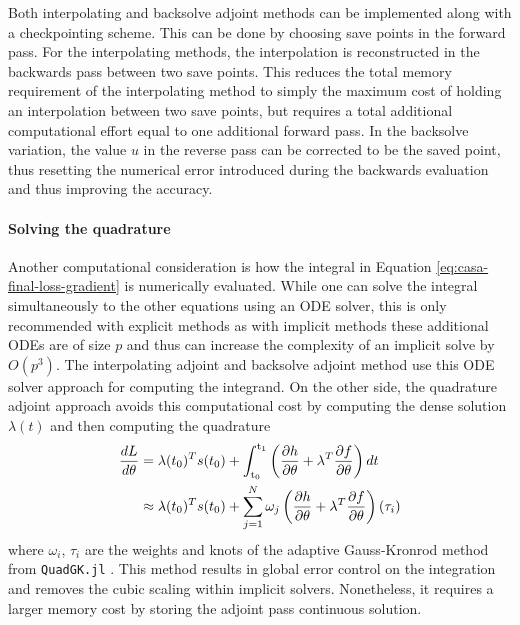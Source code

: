 Both interpolating and backsolve adjoint methods can be implemented along with a checkpointing scheme. 
This can be done by choosing save points in the forward pass. 
For the interpolating methods, the interpolation is reconstructed in the backwards pass between two save points. 
This reduces the total memory requirement of the interpolating method to simply the maximum cost of holding an interpolation between two save points, but requires a total additional computational effort equal to one additional forward pass. 
In the backsolve variation, the value $u$ in the reverse pass can be corrected to be the saved point, thus resetting the numerical error introduced during the backwards evaluation and thus improving the accuracy.

\paragraph{Solving the quadrature}

Another computational consideration is how the integral in Equation \eqref{eq:casa-final-loss-gradient} is numerically evaluated. 
While one can solve the integral simultaneously to the other equations using an ODE solver, this is only recommended with explicit methods as with implicit methods these additional ODEs are of size $p$ and thus can increase the complexity of an implicit solve by $O(p^3)$. 
The interpolating adjoint and backsolve adjoint method use this ODE solver approach for computing the integrand. 
On the other side, the quadrature adjoint approach avoids this computational cost by computing the dense solution $\lambda(t)$ and then computing the quadrature  
\begin{align}
    \frac{dL}{d\theta}
    &= 
    \lambda(t_0)^T s(t_0)
    + 
    \operatorname{\int_{t_0}^{t_1}}
    \left( \frac{\partial h}{\partial \theta} + \lambda^T \frac{\partial f}{\partial \theta} \right) dt \nonumber \\
    &\approx
    \lambda(t_0)^T s(t_0)
    + 
    \sum_{j=1}^N \omega_j \left( \frac{\partial h}{\partial \theta} + \lambda^T \frac{\partial f}{\partial \theta} \right) (\tau_i)
\end{align}
where $\omega_i$, $\tau_i$ are the weights and knots of the adaptive Gauss-Kronrod method from \texttt{QuadGK.jl} \cite{laurie1997calculation, gonnet2012review}. 
This method results in global error control on the integration and removes the cubic scaling within implicit solvers. Nonetheless, it requires a larger memory cost by storing the adjoint pass continuous solution.

